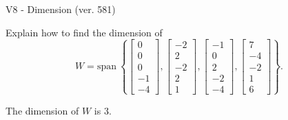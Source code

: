 \begin{exercise}
  \begin{exerciseTitle}V8 - Dimension (ver. 581)\end{exerciseTitle}
  \begin{exerciseStatement}
    Explain how to find the dimension of 
\[W=\mathrm{span}\ \left\{\left[\begin{array}{r}
0 \\
0 \\
0 \\
-1 \\
-4
\end{array}\right] , \left[\begin{array}{r}
-2 \\
2 \\
-2 \\
2 \\
1
\end{array}\right] , \left[\begin{array}{r}
-1 \\
0 \\
2 \\
-2 \\
-4
\end{array}\right] , \left[\begin{array}{r}
7 \\
-4 \\
-2 \\
1 \\
6
\end{array}\right]\right\}.\]



  \end{exerciseStatement}
  \begin{exerciseAnswer}
   The dimension of \(W\) is  \(3\).
  


  \end{exerciseAnswer}
\end{exercise}